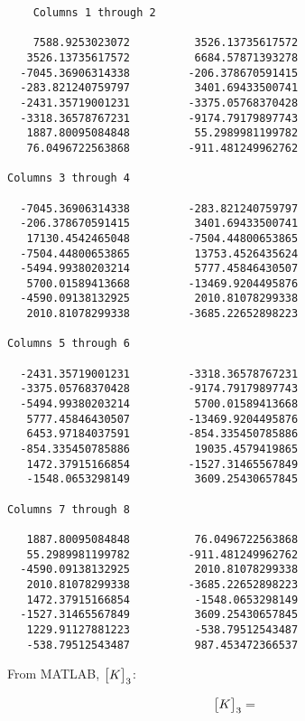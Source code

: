 \documentclass[../main.tex]{subfiles}
\begin{document}
\begin{verbatim}
    Columns 1 through 2

    7588.9253023072          3526.13735617572
   3526.13735617572          6684.57871393278
  -7045.36906314338         -206.378670591415
  -283.821240759797          3401.69433500741
  -2431.35719001231         -3375.05768370428
  -3318.36578767231         -9174.79179897743
   1887.80095084848          55.2989981199782
   76.0496722563868         -911.481249962762

Columns 3 through 4

  -7045.36906314338         -283.821240759797
  -206.378670591415          3401.69433500741
   17130.4542465048         -7504.44800653865
  -7504.44800653865          13753.4526435624
  -5494.99380203214          5777.45846430507
   5700.01589413668         -13469.9204495876
  -4590.09138132925          2010.81078299338
   2010.81078299338         -3685.22652898223

Columns 5 through 6

  -2431.35719001231         -3318.36578767231
  -3375.05768370428         -9174.79179897743
  -5494.99380203214          5700.01589413668
   5777.45846430507         -13469.9204495876
   6453.97184037591         -854.335450785886
  -854.335450785886          19035.4579419865
   1472.37915166854         -1527.31465567849
   -1548.0653298149          3609.25430657845

Columns 7 through 8

   1887.80095084848          76.0496722563868
   55.2989981199782         -911.481249962762
  -4590.09138132925          2010.81078299338
   2010.81078299338         -3685.22652898223
   1472.37915166854          -1548.0653298149
  -1527.31465567849          3609.25430657845
   1229.91127881223          -538.79512543487
   -538.79512543487          987.453472366537
\end{verbatim}


From MATLAB, \(\mqty[K]_3\):

\[
    \mqty[K]_3 =  
\]
\end{document}
